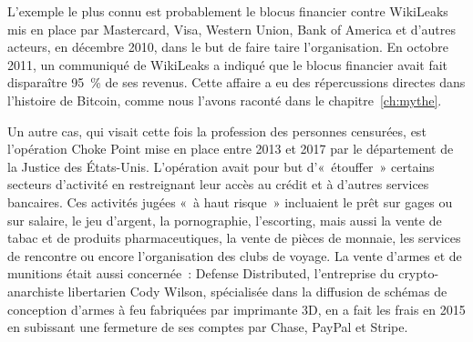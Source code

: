 
L'exemple le plus connu est probablement le blocus financier contre WikiLeaks mis en place par Mastercard, Visa, Western Union, Bank of America et d'autres acteurs, en décembre 2010, dans le but de faire taire l'organisation. En octobre 2011, un communiqué de WikiLeaks a indiqué que le blocus financier avait fait disparaître 95~\% de ses revenus. Cette affaire a eu des répercussions directes dans l'histoire de Bitcoin, comme nous l'avons raconté dans le chapitre~\ref{ch:mythe}.

Un autre cas, qui visait cette fois la profession des personnes censurées, est l'opération Choke Point mise en place entre 2013 et 2017 par le département de la Justice des États-Unis. L'opération avait pour but d'«~étouffer~» certains secteurs d'activité en restreignant leur accès au crédit et à d'autres services bancaires. Ces activités jugées «~à haut risque~» incluaient le prêt sur gages ou sur salaire, le jeu d'argent, la pornographie, l'escorting, mais aussi la vente de tabac et de produits pharmaceutiques, la vente de pièces de monnaie, les services de rencontre ou encore l'organisation des clubs de voyage. La vente d'armes et de munitions était aussi concernée~: Defense Distributed, l'entreprise du crypto-anarchiste libertarien Cody Wilson, spécialisée dans la diffusion de schémas de conception d'armes à feu fabriquées par imprimante 3D, en a fait les frais en 2015 en subissant une fermeture de ses comptes par Chase, PayPal et Stripe.

